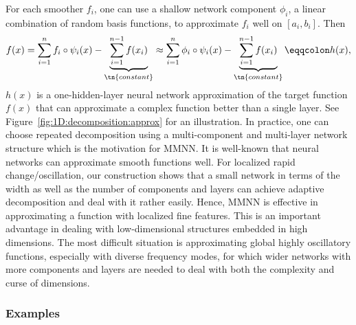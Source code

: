 \documentclass[review,hidelinks,onefignum,onetabnum]{siamart250211}
\begin{document}
For each smoother $f_i$, one can use a shallow network component $\phi_i$, a linear combination of random basis functions, to approximate $f_i$ well on $[a_i,b_i]$. Then
\begin{equation*}
    f(x)=\sum_{i=1}^n f_i\circ \psi_i(x)-\underbrace{\sum_{i=1}^{n-1}f(x_i)}_{\tn{constant}}
    \approx \sum_{i=1}^n \phi_i\circ \psi_i(x)-\underbrace{\sum_{i=1}^{n-1}f(x_i)}_{\tn{constant}}
   \eqqcolon h(x),
\end{equation*}
$h(x)$ is a one-hidden-layer neural network approximation of the target function $f(x)$ that can approximate a complex function better than a single layer.
See Figure~\ref{fig:1D:decomposition:approx} for an illustration. In practice, one can choose repeated decomposition using a multi-component and multi-layer network structure which is the motivation for MMNN. It is well-known that neural networks can approximate smooth functions well. For
localized rapid change/oscillation, our construction shows that a small network in terms of the width as well as the number of components and layers can achieve adaptive decomposition and deal with it rather easily. Hence, MMNN is effective in approximating a function with localized fine features. This is an important advantage in dealing with low-dimensional structures embedded in high dimensions. The most difficult situation is approximating global highly oscillatory functions, especially with diverse frequency modes, for which wider networks with more components and layers are needed to deal with both the complexity and curse of dimensions.


\subsubsection{Examples}
\label{sec:1D:decom:examples}


\end{document}
